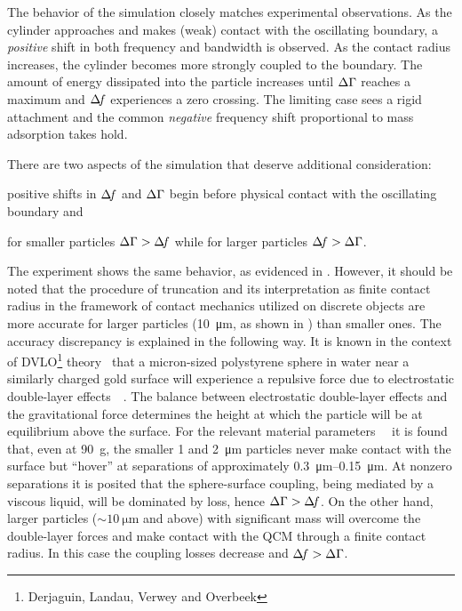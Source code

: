The behavior of the simulation closely matches
experimental observations.  As the cylinder approaches and makes (weak)
contact with the oscillating boundary, a \textit{positive} shift in both
frequency and bandwidth is observed.  As the contact radius increases, the
cylinder becomes more strongly coupled to the boundary. The amount of energy
dissipated into the particle increases until $\Delta\Gamma$ reaches a maximum and
$\Delta\!f$ experiences a zero crossing.  The limiting case sees a rigid
attachment and the common \textit{negative} frequency shift proportional to
mass adsorption takes hold.

There are two aspects of the simulation that deserve additional
consideration:%
\begin{inparaenum}[(1)]
\item positive shifts in $\Delta\!f$ and $\Delta\Gamma$ begin
before physical contact with the oscillating boundary and
\item for smaller particles $\Delta\Gamma>\Delta\!f$ while for
larger particles $\Delta\!f>\Delta\Gamma$.
\end{inparaenum}

The experiment shows the same behavior, as evidenced in
.  However, it should be noted that the procedure of
truncation and its interpretation as finite contact radius in the framework
of contact mechanics utilized on discrete objects are more accurate for
larger particles (\SI{10}{\micro\meter}, as shown in
) than smaller ones.  The accuracy discrepancy is
explained in the following way.  It is known in the context of
DVLO\footnote{Derjaguin, Landau, Verwey and Overbeek}
theory~\cite{israelachvili2011intermolecular} that a micron-sized
polystyrene sphere in water near a similarly charged gold surface will
experience a repulsive force due to electrostatic double-layer
effects~\cite{alexander1987hydrodynamic}~\cite{flicker1993quantifying}.
The balance between electrostatic double-layer effects and the
gravitational force determines the height at which the particle will be at
equilibrium above the surface.  For the relevant material
parameters~\cite{israelachvili2011intermolecular}~\cite{sharma1992factors}
it is found that, even at \SI{90}{g}, the smaller \num{1} and
\SI{2}{\micro\meter} particles never make contact with the surface but
``hover'' at separations of approximately
\SIrange{0.3}{0.15}{\micro\meter}.  At nonzero separations it is posited
that the sphere-surface coupling, being mediated by a viscous liquid, will
be dominated by loss, hence $\Delta\Gamma>\Delta\!f$.  On the other hand, larger particles
($\sim\SI{10}{\micro\meter}$ and above) with significant mass will overcome
the double-layer forces and make contact with the QCM through a finite
contact radius.  In this case the coupling losses decrease and $\Delta\!f>\Delta\Gamma$.

